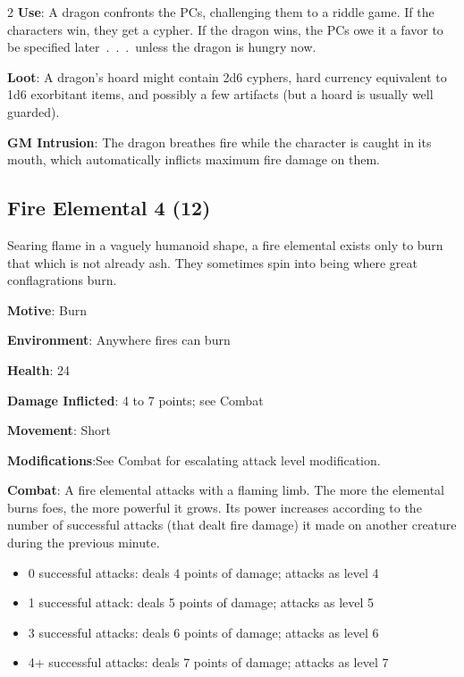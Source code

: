 \begin{multicols}{2}
\textbf{Use}: A dragon confronts the PCs, challenging them to a riddle game. If the characters win, they get a cypher. If the dragon wins, the PCs owe it a favor to be specified later . . . unless the dragon is hungry now.

\textbf{Loot}: A dragon’s hoard might contain 2d6 cyphers, hard currency equivalent to 1d6 exorbitant items, and possibly a few artifacts (but a hoard is usually well guarded).

\textbf{GM Intrusion}: The dragon breathes fire while the character is caught in its mouth, which automatically inflicts maximum fire damage on them.

\subsection{Fire Elemental	4 (12)}

Searing flame in a vaguely humanoid shape, a fire elemental exists only to burn that which is not already ash. They sometimes spin into being where great conflagrations burn. 

\textbf{Motive}: Burn

\textbf{Environment}: Anywhere fires can burn

\textbf{Health}: 24

\textbf{Damage Inflicted}: 4 to 7 points; see Combat

\textbf{Movement}: Short

\textbf{Modifications}:See Combat for escalating attack level modification.

\textbf{Combat}: A fire elemental attacks with a flaming limb. The more the elemental burns foes, the more powerful it grows. Its power increases according to the number of successful attacks (that dealt fire damage) it made on another creature during the previous minute.

\begin{itemize}
\item 0 successful attacks: deals 4 points of damage; attacks as level 4
\item 1 successful attack: deals 5 points of damage; attacks as level 5
\item 3 successful attacks: deals 6 points of damage; attacks as level 6
\item 4+ successful attacks: deals 7 points of damage; attacks as level 7
\end{itemize}


\end{multicols}
